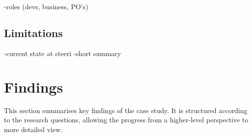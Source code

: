 \documentclass[english]{tktltiki2}
\theoremstyle{definition}
\theoremstyle{remark}
\begin{document}
 -roles (devs, business, PO's)


\subsection{Limitations}







-current state at steeri
    -short summary


\section{Findings}
This section summarises key findings of the case study. It is structured according to the research questions, allowing the progress from a higher-level perspective to more detailed view. 
\end{document}
